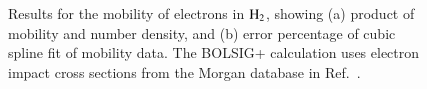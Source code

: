 \documentclass{warpdoc}
\let\citen\cite
\begin{document}
%
\begin{figure}
\centering
{}
\caption{Results for the mobility of electrons in ${\rm H_2}$, showing (a) product of mobility and number density, and (b) error percentage of cubic spline fit of  mobility data. The BOLSIG+ calculation uses electron impact cross sections from the Morgan database in Ref.\ \citen{jcp:2012:morgan}.}
\label{fig:mobility_H2}
\end{figure}
\end{document}
